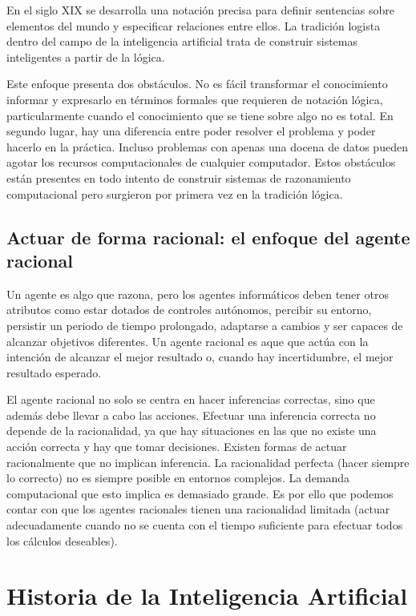 \documentclass[12pt,a4paper]{article}
\begin{document}
En el siglo XIX se desarrolla una notación precisa para definir sentencias sobre elementos del mundo y especificar relaciones entre ellos. La tradición logista dentro del campo de la inteligencia artificial trata de construir sistemas inteligentes a partir de la lógica.

Este enfoque presenta dos obstáculos. No es fácil transformar el conocimiento informar y expresarlo en términos formales que requieren de notación lógica, particularmente cuando el conocimiento que se tiene sobre algo no es total. En segundo lugar, hay una diferencia entre poder resolver el problema y poder hacerlo en la práctica. Incluso problemas con apenas una docena de datos pueden agotar los recursos computacionales de cualquier computador. Estos obstáculos están presentes en todo intento de construir sistemas de razonamiento computacional pero surgieron por primera vez en la tradición lógica.

\subsection{Actuar de forma racional: el enfoque del agente racional}
Un agente es algo que razona, pero los agentes informáticos deben tener otros atributos como estar dotados de controles autónomos, percibir su entorno, persistir un periodo de tiempo prolongado, adaptarse a cambios y ser capaces de alcanzar objetivos diferentes. Un agente racional es aque que actúa con la intención de alcanzar el mejor resultado o, cuando hay incertidumbre, el mejor resultado esperado.

El agente racional no solo se centra en hacer inferencias correctas, sino que además debe llevar a cabo las acciones. Efectuar una inferencia correcta no depende de la racionalidad, ya que hay situaciones en las que no existe una acción correcta y hay que tomar decisiones. Existen formas de actuar racionalmente que no implican inferencia. La racionalidad perfecta (hacer siempre lo correcto) no es siempre posible en entornos complejos. La demanda computacional que esto implica es demasiado grande. Es por ello que podemos contar con que los agentes racionales tienen una racionalidad limitada (actuar adecuadamente cuando no se cuenta con el tiempo suficiente para efectuar todos los cálculos deseables).

\section{Historia de la Inteligencia Artificial}
\end{document}
